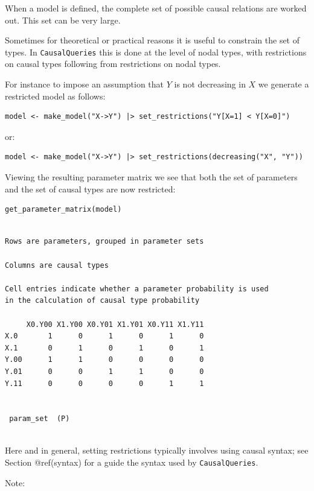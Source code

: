 \documentclass[
  article]{jss}
\begin{document}
When a model is defined, the complete set of possible causal relations
are worked out. This set can be very large.

Sometimes for theoretical or practical reasons it is useful to constrain
the set of types. In \texttt{CausalQueries} this is done at the level of
nodal types, with restrictions on causal types following from
restrictions on nodal types.

For instance to impose an assumption that \(Y\) is not decreasing in
\(X\) we generate a restricted model as follows:

\begin{verbatim}
model <- make_model("X->Y") |> set_restrictions("Y[X=1] < Y[X=0]")
\end{verbatim}

or:

\begin{verbatim}
model <- make_model("X->Y") |> set_restrictions(decreasing("X", "Y"))
\end{verbatim}

Viewing the resulting parameter matrix we see that both the set of
parameters and the set of causal types are now restricted:

\begin{verbatim}
get_parameter_matrix(model)
\end{verbatim}

\begin{verbatim}

Rows are parameters, grouped in parameter sets

Columns are causal types

Cell entries indicate whether a parameter probability is used
in the calculation of causal type probability

     X0.Y00 X1.Y00 X0.Y01 X1.Y01 X0.Y11 X1.Y11
X.0       1      0      1      0      1      0
X.1       0      1      0      1      0      1
Y.00      1      1      0      0      0      0
Y.01      0      0      1      1      0      0
Y.11      0      0      0      0      1      1

 
 param_set  (P)
 
\end{verbatim}

Here and in general, setting restrictions typically involves using
causal syntax; see Section @ref(syntax) for a guide the syntax used by
\texttt{CausalQueries}.

Note:
\end{document}
